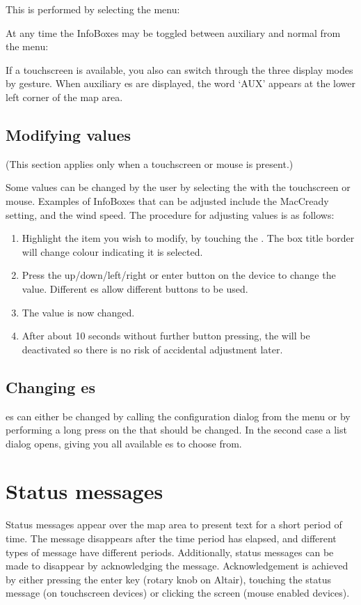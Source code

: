 \documentclass[a4paper,12pt]{refrep}
\begin{document}
This is performed by selecting the menu:
\begin{quote}
\blink{}
\end{quote}
At any time the InfoBoxes may be toggled between auxiliary and normal from
the menu:
\begin{quote}
\blink{}
\end{quote}
If a touchscreen is available, you also can switch through the three display
modes by gesture.
When auxiliary {\InfoBox}es are displayed, the word `AUX' appears at the
lower left corner of the map area.

\subsection*{Modifying {\InfoBox} values}
(This section applies only when a touchscreen or mouse is present.)

Some {\InfoBox} values can be changed by the user by selecting the
{\InfoBox} with the touchscreen or mouse.  Examples of InfoBoxes that can
be adjusted include the MacCready setting, and the wind speed.
The procedure for adjusting {\InfoBox} values is as follows:
\begin{enumerate}
\item Highlight the item you wish to modify, by touching the {\InfoBox}. The box
title border will change colour indicating it is selected.
\item Press the up/down/left/right or enter button on the device
to change the value.  Different {\InfoBox}es allow different buttons to
be used.
\item The value is now changed.
\item After about 10 seconds without further button pressing, the {\InfoBox}
will be deactivated so there is no risk of accidental adjustment later.
\end{enumerate}

\subsection*{Changing {\InfoBox}es}
{\InfoBox}es can either be changed by calling the configuration dialog from the
menu \blink{} or by performing a long press on
the {\InfoBox} that should be changed. In the second case a list dialog opens,
giving you all available {\InfoBox}es to choose from.

\section{Status messages}
Status messages appear over the map area to present text for a short period of
time.  The message disappears after the time period has elapsed, and different
types of message have different periods. Additionally, status messages can be
made to disappear by acknowledging the message.  Acknowledgement is achieved by
either pressing the enter key (rotary knob on Altair), touching the status
message (on touchscreen devices) or clicking the screen (mouse enabled devices).
\end{document}
